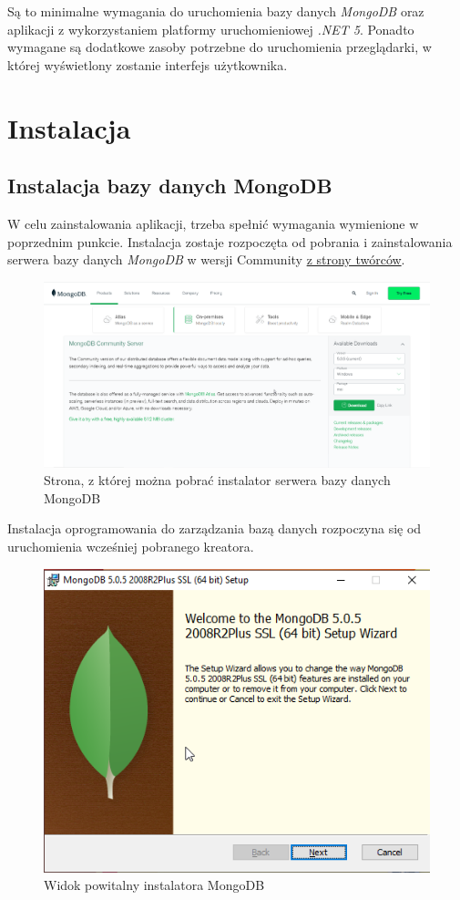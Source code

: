 \documentclass[a4paper,twoside,12pt]{book}
\begin{document}
Są to minimalne wymagania do uruchomienia bazy danych \textit{MongoDB} oraz aplikacji z wykorzystaniem platformy uruchomieniowej \textit{.NET 5}. Ponadto wymagane są dodatkowe zasoby potrzebne do uruchomienia przeglądarki, w której wyświetlony zostanie interfejs użytkownika.

\section {Instalacja}

\subsection{Instalacja bazy danych MongoDB}
W celu zainstalowania aplikacji, trzeba spełnić wymagania wymienione w poprzednim punkcie. Instalacja zostaje rozpoczęta od pobrania i zainstalowania serwera bazy danych \textit{MongoDB} w wersji Community \href{https://www.mongodb.com/try/download/community}{z strony twórców}.
\begin{figure}[h!]
	\centering
	\includegraphics[width=1\linewidth]{../zrzuty_ekranu/instalcja_mongodb/mongodbsite}
	\caption{Strona, z której można pobrać instalator serwera bazy danych MongoDB}
	\label{fig:mongodbsite}
\end{figure}
\FloatBarrier

Instalacja oprogramowania do zarządzania bazą danych rozpoczyna się od uruchomienia wcześniej pobranego kreatora.
\begin{figure}[h!]
	\centering
	\includegraphics[width=0.75\linewidth]{../zrzuty_ekranu/instalcja_mongodb/mongodb1}
	\caption{Widok powitalny instalatora MongoDB}
	\label{fig:mongodb1}
\end{figure}
\FloatBarrier
\end{document}
